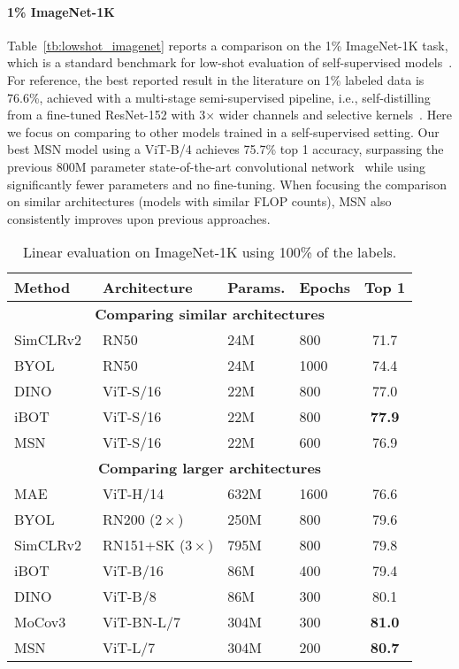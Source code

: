 \documentclass{article}
\begin{document}
\paragraph{1\% ImageNet-1K}
Table~\ref{tb:lowshot_imagenet} reports a comparison on the 1\% ImageNet-1K task, which is a standard benchmark for low-shot evaluation of self-supervised models~\citep{chen2020simple}.
For reference, the best reported result in the literature on 1\% labeled data is 76.6\%, achieved with a multi-stage semi-supervised pipeline, i.e., self-distilling from a fine-tuned ResNet-152 with 3$\times$ wider channels and selective kernels~\citep{chen2020big}.
Here we focus on comparing to other models trained in a self-supervised setting.
Our best MSN model using a ViT-B/4 achieves 75.7\% top 1 accuracy, surpassing the previous 800M parameter state-of-the-art convolutional network~\citep{chen2020big} while using significantly fewer parameters and no fine-tuning.
When focusing the comparison on similar architectures (models with similar FLOP counts), MSN also consistently improves upon previous approaches. 
\begin{table}[t]
    \caption{Linear evaluation on ImageNet-1K using 100\% of the labels.}
    \label{tb:vit-s_imagenet}
    \centering
    \begin{tabular}{l l l l c}
        \bf Method & \bf Architecture & \bf Params. & \bf Epochs & \bf Top 1 \\\toprule
        \multicolumn{5}{c}{\scriptsize\bf Comparing similar architectures}\\[2mm]
        SimCLRv2~\citep{chen2020big} & RN50 & 24M & 800 & 71.7 \\
BYOL~\citep{grill2020bootstrap} & RN50 & 24M & 1000 & 74.4 \\
        DINO~\citep{caron2021emerging} & ViT-S/16 & 22M & 800 & 77.0 \\
        iBOT~\citep{zhou2021ibot} & ViT-S/16 & 22M & 800 & \bf 77.9 \\
        MSN & ViT-S/16 & 22M & 600 & \cellcolor{fbApp} 76.9 \\
        \midrule \midrule
        \multicolumn{5}{c}{\scriptsize\bf Comparing larger architectures}\\[2mm]
MAE~\citep{he2021masked} & ViT-H/14 & 632M & 1600 & 76.6 \\
        BYOL~\citep{grill2020bootstrap} &  RN200 ($2\times$) & 250M & 800 & 79.6 \\
        SimCLRv2~\citep{chen2020big} & RN151+SK ($3\times$) & 795M & 800 & 79.8 \\
        \multirow{1}{*}{iBOT}~\citep{zhou2021ibot} & ViT-B/16 & 86M & 400 & 79.4 \\
DINO~\citep{caron2021emerging} & ViT-B/8 & 86M & 300 & 80.1 \\
MoCov3~\citep{chen2021empirical}& ViT-BN-L/7 & 304M & 300 & \bf 81.0 \\
MSN & ViT-L/7 & 304M & 200 & \cellcolor{fbApp} \bf 80.7 \\
        \bottomrule
    \end{tabular}
\end{table}
\end{document}
